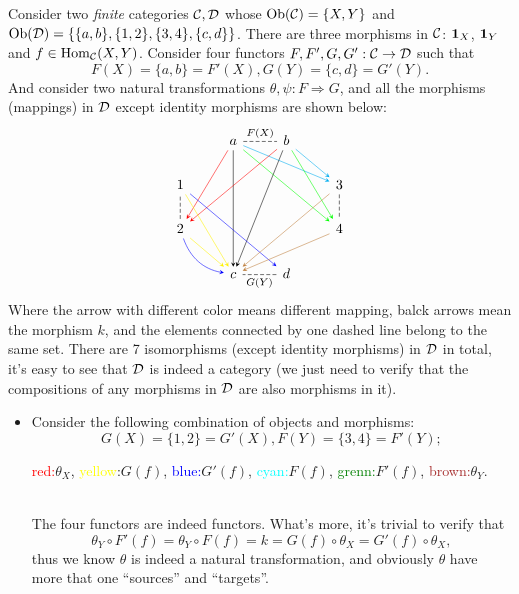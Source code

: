 \documentclass{article}
\begin{document}
\begin{exm}
	Consider two \emph{finite} categories $\mathcal{C},\mathcal{D}$ whose $\mathrm{Ob}(\mathcal{C})=\{X,Y\}$ and $\mathrm{Ob}(\mathcal{D})=\{\{a,b\},\{1,2\},\{3,4\},\{c,d\}\}$. There are three morphisms in $\mathcal{C}$: $\mathbf{1}_X$, $\mathbf{1}_Y$ and $f\in\mathrm{Hom}_{\mathcal{C}}(X,Y)$. Consider four functors $F,F',G,G':\mathcal{C}\to\mathcal{D}$ such that
	\[F(X)=\{a,b\}=F'(X),G(Y)=\{c,d\}=G'(Y).\]
	And consider two natural transformations $\theta,\psi:F\Rightarrow G$, and all the morphisms (mappings) in $\mathcal{D}$ except identity morphisms are shown below:
	\[\begin{tikzcd}
	& a \arrow[r,no head,dashed,"F(X)"] \arrow[->,>=stealth,ldd,color=red] \arrow[->,>=stealth,rrdd,color=green] \arrow[->,>=stealth,rrd,color=cyan] \arrow[->,>=stealth,ddd]
	& b \arrow[->,>=stealth,lldd,color=red] \arrow[->,>=stealth,rd,color=cyan] \arrow[->,>=stealth,rdd,color=green] \arrow[->,>=stealth,lddd] & \\
	  1 \arrow[->,>=stealth,rdd,color=yellow] \arrow[->,>=stealth,rrdd,color=blue] && 
	& 3 \arrow[d,no head,dashed] \arrow[->,>=stealth,lldd,color=brown]\\
	  2 \arrow[u,no head,dashed] \arrow[->,>=stealth,rd,color=yellow] \arrow[->,>=stealth,rd,color=blue,bend right] &&
	& 4 \arrow[->,>=stealth,lld,color=brown]\\
	& c 
	& d \arrow[l,no head,dashed,"G(Y)"] &         
	\end{tikzcd}\]
	Where the arrow with different color means different mapping, balck arrows mean the morphism $k$, and the elements connected by one dashed line belong to the same set. There are 7 isomorphisms (except identity morphisms) in $\mathcal{D}$ in total, it's easy to see that $\mathcal{D}$ is indeed a category (we just need to verify that the compositions of any morphisms in $\mathcal{D}$ are also morphisms in it).
	
	\begin{itemize}
		\item Consider the following combination of objects and morphisms:
			\[G(X)=\{1,2\}=G'(X),F(Y)=\{3,4\}=F'(Y);\]
			\centerline{\textcolor{red}{red:}$\theta_X$, \textcolor{yellow}{yellow}:$G(f)$, \textcolor{blue}{blue:}$G'(f)$, \textcolor{cyan}{cyan:}$F(f)$, \textcolor{green}{grenn:}$F'(f)$, \textcolor{brown}{brown:}$\theta_Y$.}\\
		The four functors are indeed functors. What's more, it's trivial to verify that
		\[\theta_Y\circ F'(f)=\theta_Y\circ F(f)=k=G(f)\circ\theta_X=G'(f)\circ\theta_X,\]
		thus we know $\theta$ is indeed a natural transformation, and obviously $\theta$ have more that one ``sources'' and ``targets''.
		

\end{itemize}
\end{exm}
\end{document}
